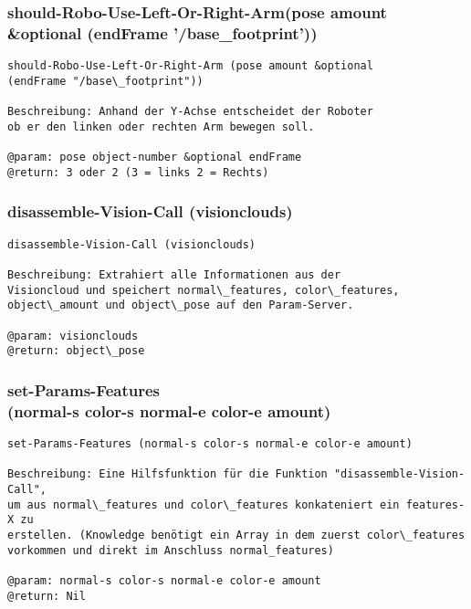 \documentclass{suturo}
\begin{document}


\subsubsection{should-Robo-Use-Left-Or-Right-Arm(pose amount \\
\&optional (endFrame '/base\_footprint'))}
\begin{verbatim}
should-Robo-Use-Left-Or-Right-Arm (pose amount &optional
(endFrame "/base\_footprint"))

Beschreibung: Anhand der Y-Achse entscheidet der Roboter
ob er den linken oder rechten Arm bewegen soll.

@param: pose object-number &optional endFrame
@return: 3 oder 2 (3 = links 2 = Rechts)
\end{verbatim}


\subsubsection{disassemble-Vision-Call (visionclouds)}
\begin{verbatim}
disassemble-Vision-Call (visionclouds)

Beschreibung: Extrahiert alle Informationen aus der 
Visioncloud und speichert normal\_features, color\_features, 
object\_amount und object\_pose auf den Param-Server.
 
@param: visionclouds
@return: object\_pose
\end{verbatim}



\subsubsection{set-Params-Features \\
(normal-s color-s normal-e color-e amount)}
\begin{verbatim}
set-Params-Features (normal-s color-s normal-e color-e amount)

Beschreibung: Eine Hilfsfunktion für die Funktion "disassemble-Vision-Call", 
um aus normal\_features und color\_features konkateniert ein features-X zu 
erstellen. (Knowledge benötigt ein Array in dem zuerst color\_features 
vorkommen und direkt im Anschluss normal_features)

@param: normal-s color-s normal-e color-e amount
@return: Nil
\end{verbatim}
\end{document}
